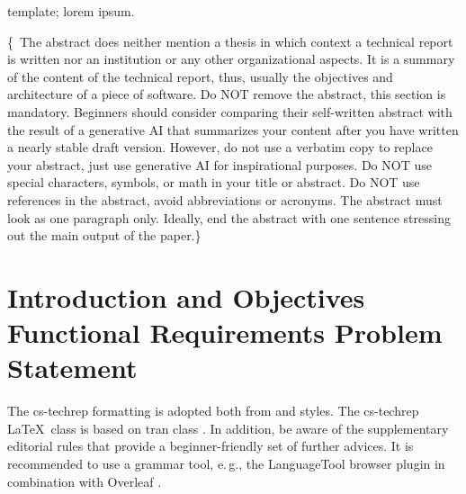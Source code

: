 \documentclass[conference,a4paper,flushend]{cs-techrep} %
\begin{document}
\selectlanguage{\cstechrepLang}

\maketitle

\begin{abstract}
This paper demonstrates an example of a technical report in computer science or software engineering, based on the \texttt{cs-techrep} LaTeX class.
The example is intended for beginners, e.\,g., undergraduate students.
It contains a basic outline template and usually fills it with dummy text, but some sections are describing the intent of the outline template and its sections.
Graphic exclamation marks highlight important remarks.
\end{abstract}

\begin{IEEEkeywords}
template; lorem ipsum.
\end{IEEEkeywords}

\{\,\faWarning{} The abstract does neither mention a thesis in which context a technical report is written nor an institution or any other organizational aspects.
It is a summary of the content of the technical report, thus, usually the objectives and architecture of a piece of software.
Do NOT remove the abstract, this section is mandatory.
Beginners should consider comparing their self-written abstract with the result of a generative AI that summarizes your content after you have written a nearly stable draft version. However, do not use a verbatim copy to replace your abstract, just use generative AI for inspirational purposes.
Do NOT use special characters, symbols, or math in your title or abstract.
Do NOT use references in the abstract, avoid abbreviations or acronyms.
The abstract must look as one paragraph only.
Ideally, end the abstract with one sentence stressing out the main output of the paper.\}

\section{Introduction and Objectives \textbar{} Functional Requirements \textbar{} Problem Statement}

The cs-techrep formatting is adopted both from  \cite{ieee2018formattingrules} and  \cite{iaria2014formattingrules} styles.
The cs-techrep \LaTeX\ class is based on tran class \cite{ieee2015howto}.
In addition, be aware of the supplementary  editorial rules \cite{iaria2009editorialrules} \faWarning{} that provide a beginner-friendly set of further advices.
It is recommended to use a grammar tool, e.\,g., the LanguageTool \cite{languagetool} browser plugin in combination with Overleaf \cite{overleaf}.
\end{document}
